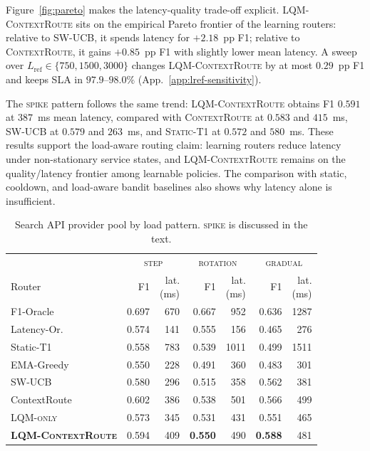 \documentclass[11pt]{article}
\newcommand{\contextroute}{\textsc{ContextRoute}}
\newcommand{\swucb}{\textsc{SW-UCB}}
\newcommand{\lqm}{\textsc{LQM-only}}
\newcommand{\lqmcr}{\textsc{LQM-ContextRoute}}
\begin{document}
Figure~\ref{fig:pareto} makes the latency-quality trade-off explicit. \lqmcr{} sits on the empirical Pareto frontier of the learning routers: relative to \swucb{}, it spends latency for $+2.18$~pp F1; relative to \contextroute{}, it gains $+0.85$~pp F1 with slightly lower mean latency. A sweep over $L_{\text{ref}}\in\{750,1500,3000\}$ changes \lqmcr{} by at most $0.29$~pp F1 and keeps SLA in $97.9$--$98.0\%$ (App.~\ref{app:lref-sensitivity}).

The \textsc{spike} pattern follows the same trend: \lqmcr{} obtains F1 $0.591$ at $387$~ms mean latency, compared with \contextroute{} at $0.583$ and $415$~ms, \swucb{} at $0.579$ and $263$~ms, and \textsc{Static-T1} at $0.572$ and $580$~ms. These results support the load-aware routing claim: learning routers reduce latency under non-stationary service states, and \lqmcr{} remains on the quality/latency frontier among learnable policies. The comparison with static, cooldown, and load-aware bandit baselines also shows why latency alone is insufficient.

\begin{table}[ht]
\centering\scriptsize
\setlength{\tabcolsep}{4pt}
\begin{tabular}{l rr rr rr}
\toprule
& \multicolumn{2}{c}{\textsc{step}}
& \multicolumn{2}{c}{\textsc{rotation}}
& \multicolumn{2}{c}{\textsc{gradual}} \\
Router & F1 & \shortstack{lat.\\(ms)} & F1 & \shortstack{lat.\\(ms)}
& F1 & \shortstack{lat.\\(ms)} \\
\midrule
F1-Oracle       & 0.697 & 670  & 0.667 & 952  & 0.636 & 1287 \\
Latency-Or.     & 0.574 & 141  & 0.555 & 156  & 0.465 & 276 \\
\midrule
Static-T1       & 0.558 & 783  & 0.539 & 1011 & 0.499 & 1511 \\
EMA-Greedy      & 0.550 & 228  & 0.491 & 360  & 0.483 & 301 \\
SW-UCB          & 0.580 & 296  & 0.515 & 358  & 0.562 & 381 \\
ContextRoute    & 0.602 & 386  & 0.538 & 501  & 0.566 & 499 \\
\lqm{}          & 0.573 & 345  & 0.531 & 431  & 0.551 & 465 \\
\textbf{\lqmcr{}} & 0.594 & 409 & \textbf{0.550} & 490 & \textbf{0.588} & 481 \\
\bottomrule
\end{tabular}
\caption{Search API provider pool by load pattern. \textsc{spike} is
discussed in the text.}
\label{tab:main}
\end{table}
\end{document}
